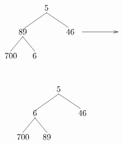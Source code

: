 \begin{minipage}{0.3\textwidth}
\[\begin{xy}
,(0,0)*+=<10mm>[]\txt<2cm>{5}
,(-10,-10)*+=<10mm>[]\txt<2cm>{89}
,(10,-10)*+=<10mm>[]\txt<2cm>{46}
,(-15,-20)*+=<10mm>[]\txt<2cm>{700}
,(-5,-20)*+=<10mm>[]\txt<2cm>{6}

\ar@{->} (15,-10);(30,-10)
\ar@{-} (0,-2);(-10,-9) %
\ar@{-} (0,-2);(9,-8) %
\ar@{-} (-10,-12);(-15,-18) %
\ar@{-} (-10,-12);(-5,-18) %
\end{xy}\]
\end{minipage}
\begin{minipage}{0.5\textwidth}
\[\begin{xy}
,(0,0)*+=<10mm>[]\txt<2cm>{5}
,(-10,-10)*+=<10mm>[]\txt<2cm>{6}
,(10,-10)*+=<10mm>[]\txt<2cm>{46}
,(-15,-20)*+=<10mm>[]\txt<2cm>{700}
,(-5,-20)*+=<10mm>[]\txt<2cm>{89}

\ar@{-} (0,-2);(-10,-9) %
\ar@{-} (0,-2);(9,-8) %
\ar@{-} (-10,-12);(-15,-18) %
\ar@{-} (-10,-12);(-5,-18) %
\end{xy}\]
\end{minipage}
